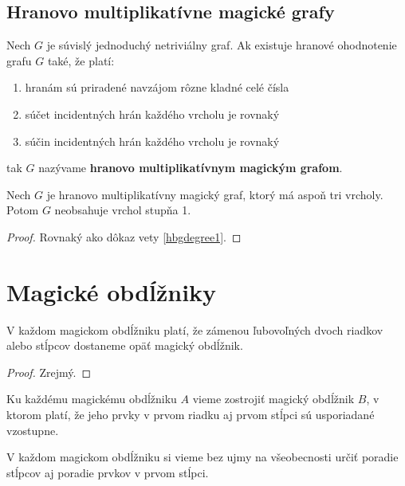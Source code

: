 \subsection{Hranovo multiplikatívne magické grafy}

\begin{definition} Nech $G$ je súvislý jednoduchý netriviálny graf. Ak existuje hranové ohodnotenie grafu $G$ také, že platí:

\begin{enumerate}
\item hranám sú priradené navzájom rôzne kladné celé čísla
\item súčet incidentných hrán každého vrcholu je rovnaký
\item súčin incidentných hrán každého vrcholu je rovnaký
\end{enumerate}

tak $G$ nazývame \textbf{hranovo multiplikatívnym magickým grafom}.
\end{definition} 

\begin{theorem} Nech $G$ je hranovo multiplikatívny magický graf, ktorý má aspoň tri vrcholy. Potom $G$ neobsahuje vrchol stupňa 1.
\end{theorem}

\begin{proof} Rovnaký ako dôkaz vety \ref{hbgdegree1}.
\end{proof} 

\section{Magické obdĺžniky}

\begin{theorem} V každom magickom obdĺžniku platí, že zámenou ľubovoľných dvoch riadkov alebo stĺpcov dostaneme opäť magický obdĺžnik.
\end{theorem}

\begin{proof}
Zrejmý.
\end{proof}

\begin{consequence} Ku každému magickému obdĺžniku $A$ vieme zostrojiť magický obdĺžnik $B$, v ktorom platí, že jeho prvky v prvom riadku aj prvom stĺpci sú usporiadané vzostupne.
\end{consequence}

\begin{consequence}
\label{rectangleorder}
V každom magickom obdĺžniku si vieme bez ujmy na všeobecnosti určiť poradie stĺpcov aj poradie prvkov v prvom stĺpci.
\end{consequence}


